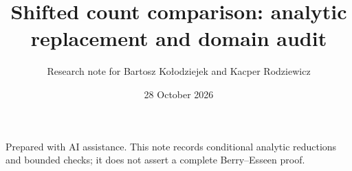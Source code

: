 \documentclass[11pt,a4paper]{article}
\begin{document}
\title{Shifted count comparison: analytic replacement and domain audit}
\author{Research note for Bartosz Ko{\l}odziejek and Kacper Rodziewicz}
\date{28 October 2026}
\maketitle
\noindent Prepared with AI assistance. This note records conditional analytic
reductions and bounded checks; it does not assert a complete Berry--Esseen proof.

\end{document}
